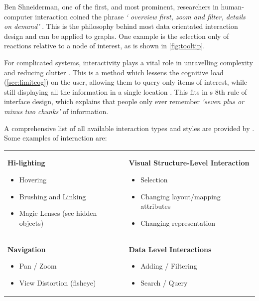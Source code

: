 Ben Shneiderman, one of the first, and most prominent, researchers in human-computer interaction coined the phrase \emph{` overview first, zoom and filter, details on demand'}  \citep{mantra}. This is the philosophy behind most data orientated interaction design and can be applied to graphs. One example is the selection only of reactions relative to a node of interest, as is shown in \autoref{fig:tooltip}.

For complicated systems, interactivity plays a vital role in unravelling complexity and reducing clutter \citep{interaction1}. This is a method which lessens the cognitive load (\autoref{sec:limitcog}) on the user, allowing them to query only items of interest, while still displaying all the information in a single location \citep{oneplace}. This fits in \cite{rule8}s 8th rule of interface design, which explains that people only ever remember \emph{`seven plus or minus two chunks'} of information.

A comprehensive list of all available interaction types and styles are provided by \cite{ch6}. Some examples of interaction are:\\

\begin{table}[h]
    \centering
    \begin{tabular}{p{}p{}}
\textbf{Hi-lighting}
\begin{itemize}
\item Hovering
\item Brushing and Linking
\item Magic Lenses (see hidden objects)
\end{itemize}
&
\textbf{Visual Structure-Level Interaction}
\begin{itemize}
\item Selection
\item Changing layout/mapping attributes
\item Changing representation
\end{itemize}
\\
\textbf{Navigation}
\begin{itemize}
\item Pan / Zoom
\item View Distortion (fisheye)
\end{itemize}
&
\textbf{Data Level Interactions}
\begin{itemize}
\item Adding / Filtering
\item Search / Query
\end{itemize}

\end{tabular}
    \label{tab:interactive}
\end{table}

